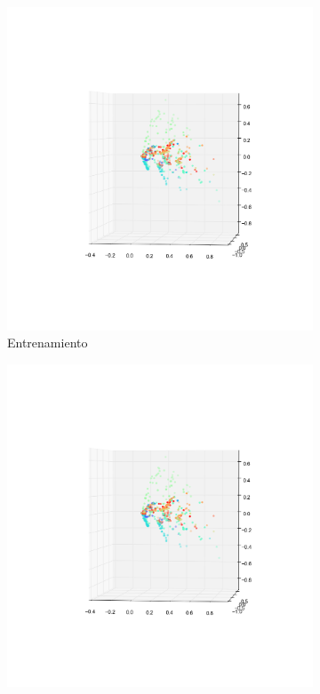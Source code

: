 \begin{figure}
        \begin{subfigure}[b]{0.5\textwidth}
                \includegraphics[width=\linewidth]{secciones/graficos/oja/1_train.png}
                \caption{Entrenamiento}
                \label{fig: ej1_oja_3d_1_train}
        \end{subfigure}%
        \begin{subfigure}[b]{0.5\textwidth}
                \includegraphics[width=\linewidth]{secciones/graficos/oja/1_train.png}

\end{subfigure}
\end{figure}
